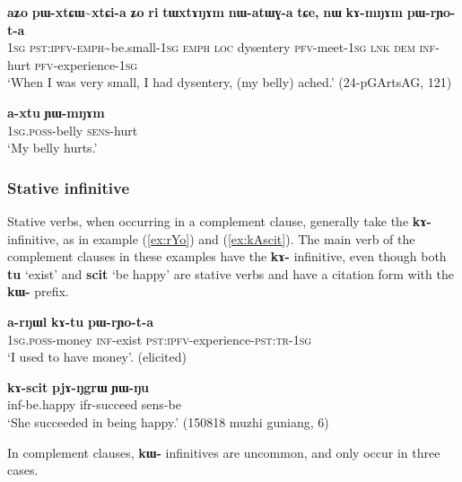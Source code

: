 \documentclass[oneside,a4paper,11pt]{article}
\newcommand{\ipa}[1]{\textbf{\phon#1}} %
\newcommand{\jpg}[2]{\ipa{#1} `#2'} %
\newcommand{\tld}{\textasciitilde{}}
\begin{document}
 \begin{exe}
\ex \label{ex:kAmNAm}
\gll \ipa{aʑo} 	\ipa{pɯ-xtɕɯ\tld{}xtɕi-a} 	\ipa{ʑo} 	\ipa{ri} 	\ipa{tɯxtɤŋɤm} 	\ipa{nɯ-atɯɣ-a} 	\ipa{tɕe,} 	\ipa{nɯ} 	\ipa{kɤ-mŋɤm} 	\ipa{pɯ-rɲo-t-a} \\
\textsc{1sg} \textsc{pst:ipfv-emph}\tld{}be.small-\textsc{1sg} \textsc{emph} \textsc{loc} dysentery \textsc{pfv}-meet-\textsc{1sg} \textsc{lnk} \textsc{dem} \textsc{inf}-hurt \textsc{pfv}-experience-\textsc{1sg} \\
\glt `When I was very small, I had dysentery, (my belly) ached.'  (24-pGArtsAG, 121)
\end{exe}

 \begin{exe}
\ex \label{ex:YWmNAm}
\gll \ipa{a-xtu} 	\ipa{ɲɯ-mŋɤm} \\
\textsc{1sg.poss}-belly \textsc{sens}-hurt \\
\glt `My belly hurts.' 
\end{exe}
 
 \subsubsection{Stative infinitive} \label{sec:stative.inf}
Stative verbs, when occurring in a complement clause, generally take the \ipa{kɤ-} infinitive, as in example  (\ref{ex:rYo}) and (\ref{ex:kAscit}). The main verb of the complement clauses in these examples have the \ipa{kɤ-} infinitive, even though both \jpg{tu}{exist} and \jpg{scit}{be happy} are stative verbs and have a citation form with the \ipa{kɯ-} prefix.

\begin{exe}
\ex \label{ex:rYo}
\gll \ipa{a-rŋɯl} 	\ipa{kɤ-tu} 	\ipa{pɯ-rɲo-t-a} \\
\textsc{1sg.poss}-money \textsc{inf}-exist \textsc{pst:ipfv}-experience-\textsc{pst:tr-1sg} \\
\glt `I used to have money'. (elicited)
\end{exe}

\begin{exe}
\ex \label{ex:kAscit}
 \gll \ipa{kɤ-scit} 	\ipa{pjɤ-ŋgrɯ} 	\ipa{ɲɯ-ŋu}  \\
 inf-be.happy ifr-succeed sens-be \\
 \glt `She succeeded in being happy.' (150818 muzhi guniang, 6)
 \end{exe} 
 
In complement clauses, \ipa{kɯ-} infinitives are uncommon, and only occur in three cases.
 
\end{document}
